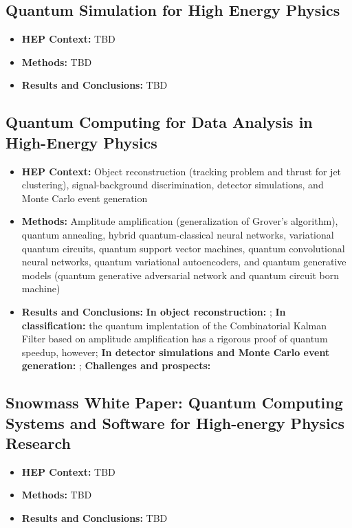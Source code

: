 \subsection{Quantum Simulation for High Energy Physics~\cite{Bauer:2022hpo}}
\begin{itemize}
	\item \textbf{HEP Context: }TBD
	\item \textbf{Methods: }TBD
	\item \textbf{Results and Conclusions: }TBD
\end{itemize}\subsection{Quantum Computing for Data Analysis in High-Energy Physics~\cite{Delgado:2022tpc}}
\begin{itemize}
	\item \textbf{HEP Context: }Object reconstruction (tracking problem and  thrust for jet clustering), signal-background discrimination, detector simulations, and Monte Carlo event generation
	\item \textbf{Methods: }Amplitude amplification (generalization of Grover's algorithm), quantum annealing, hybrid quantum-classical neural networks, variational quantum circuits, quantum support vector machines, quantum convolutional neural networks, quantum variational autoencoders, and quantum generative models (quantum generative adversarial network and quantum circuit born machine)
	\item \textbf{Results and Conclusions: }\textbf{In object reconstruction:} ; \textbf{In classification:} the quantum implentation of the Combinatorial Kalman Filter based on amplitude amplification has a rigorous proof of quantum speedup, however; \textbf{In detector simulations and Monte Carlo event generation:} ; \textbf{Challenges and prospects:} 
\end{itemize}\subsection{Snowmass White Paper: Quantum Computing Systems and Software for High-energy Physics Research~\cite{Humble:2022vtm}}
\begin{itemize}
	\item \textbf{HEP Context: }TBD
	\item \textbf{Methods: }TBD
	\item \textbf{Results and Conclusions: }TBD
\end{itemize}

